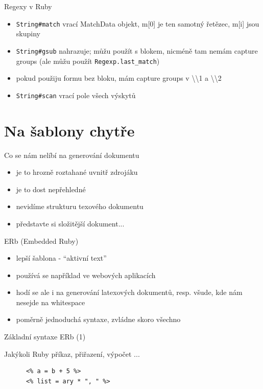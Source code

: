 \documentclass{beamer}
\begin{document}
\begin{frame}{Regexy v Ruby}
  \begin{itemize}
    \item \texttt{String\#match} vrací MatchData objekt, m[0] je ten samotný řetězec, m[i] jsou skupiny
    \item \texttt{String\#gsub} nahrazuje; můžu použít s blokem, nicméně tam nemám capture groups (ale můžu použít \texttt{Regexp.last\_match})
    \item pokud použiju formu bez bloku, mám capture groups v \textbackslash \textbackslash 1 a \textbackslash \textbackslash 2
    \item \texttt{String\#scan} vrací pole všech výskytů
  \end{itemize}
\end{frame}


\section{Na šablony chytře}

\begin{frame}{Co se nám nelíbí na generování dokumentu}
  \begin{itemize}
    \item je to hrozně roztahané uvnitř zdrojáku
    \item je to dost nepřehledné
    \item nevidíme strukturu texového dokumentu
    \item představte si složitější dokument...
  \end{itemize}
\end{frame}

\begin{frame}{ERb (Embedded Ruby)}
  \begin{itemize}
    \item lepší šablona - ``aktivní text''
    \item používá se například ve webových aplikacích
    \item hodí se ale i na generování latexových dokumentů, resp. všude, kde nám nesejde na whitespace
    \item poměrně jednoduchá syntaxe, zvládne skoro všechno
  \end{itemize}
\end{frame}

\begin{frame}[fragile]{Základní syntaxe ERb (1)}
  \begin{block}{ }
    Jakýkoli Ruby příkaz, přiřazení, výpočet ...
    \scriptsize
    \begin{verbatim}
      <% a = b + 5 %>
      <% list = ary * ", " %>
    \end{verbatim}
  \end{block}
\end{frame}
\end{document}
